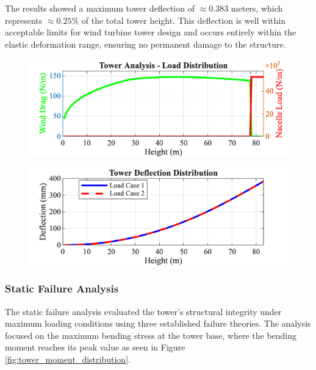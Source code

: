\documentclass[11pt]{article}
\begin{document}
The results showed a maximum tower deflection of $\approx 0.383$ meters, which represents $\approx 0.25\%$ of the total tower height. This deflection is well within acceptable limits for wind turbine tower design and occurs entirely within the elastic deformation range, ensuring no permanent damage to the structure.
\begin{figure}[H]
  \centering
  \begin{minipage}{0.49\textwidth}
    \centering
    \includegraphics[width=\linewidth]{media/Tower_Load_Distribution.png}
    \label{fig:tower_load_distribution}
  \end{minipage}
  \hfill
  \begin{minipage}{0.49\textwidth}
    \centering
    \includegraphics[width=\linewidth]{media/Tower_Deflection_Only.png}
    \label{fig:tower_deflection}
  \end{minipage}
\end{figure}


\subsubsection{Static Failure Analysis}

The static failure analysis evaluated the tower's structural integrity under maximum loading conditions using three established failure theories. The analysis focused on the maximum bending stress at the tower base, where the bending moment reaches its peak value as seen in Figure \ref{fig:tower_moment_distribution}.
\end{document}

